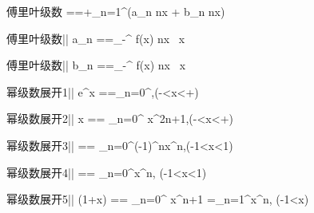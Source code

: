 傅里叶级数
==+\sum_{n=1}^\infty(a_n \cos nx + b_n \sin nx)



傅里叶级数||
a_n
==\int_{-\pi}^{\pi} f(x) \cos nx \, x


傅里叶级数||
b_n
==\int_{-\pi}^{\pi} f(x) \sin nx \, x


幂级数展开1||
e^x
==\sum_{n=0}^\infty{},(-\infty<x<+\infty)


幂级数展开2||
\sin x
== \sum_{n=0}^{\infty} x^{2n+1},(-\infty<x<+\infty)


幂级数展开3||
== \sum_{n=0}^{\infty}(-1)^nx^n,(-1<x<1)


幂级数展开4||
== \sum_{n=0}^{\infty}x^n, (-1<x<1)


幂级数展开5||
\ln(1+x)
== \sum_{n=0}^\infty {} x^{n+1}
=\sum_{n=1}^\infty {}x^n, (-1<x)




